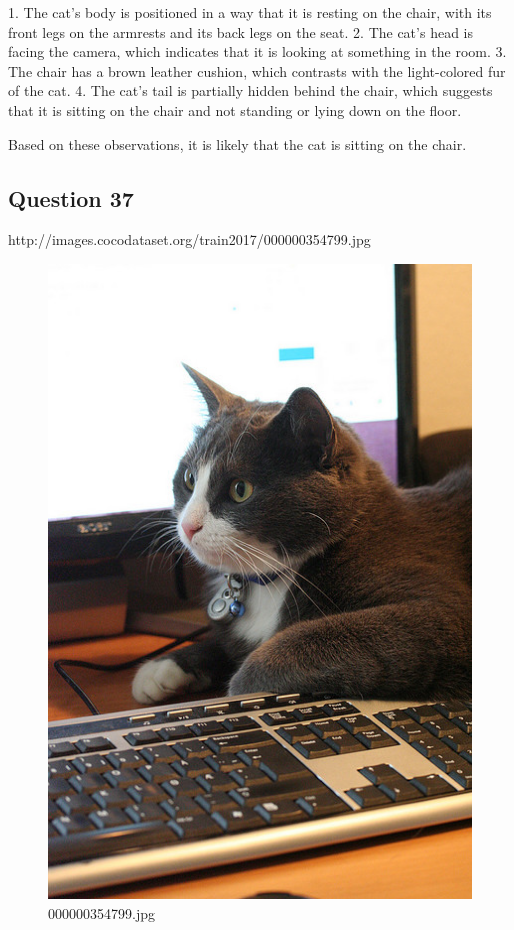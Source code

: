 \begin{enumerate}
        1. The cat’s body is positioned in a way that it is resting on the chair, with its front legs on the armrests and its back legs on the seat.
        2. The cat’s head is facing the camera, which indicates that it is looking at something in the room.
        3. The chair has a brown leather cushion, which contrasts with the light-colored fur of the cat.
        4. The cat’s tail is partially hidden behind the chair, which suggests that it is sitting on the chair and not standing or lying down on the floor.
        
        Based on these observations, it is likely that the cat is sitting on the chair.
    \end{enumerate}
    \subsection*{Question 37}
    http://images.cocodataset.org/train2017/000000354799.jpg
    \begin{figure}[h]
        \centering
        \includegraphics[width=0.8\linewidth]{../image set/easy/000000354799.jpg}
        \caption{000000354799.jpg}
    \end{figure}
